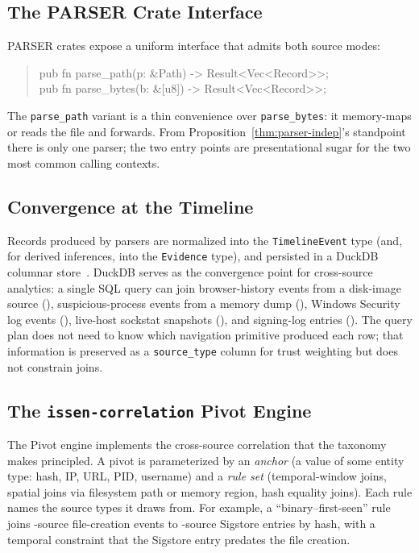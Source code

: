\subsection{The PARSER Crate Interface}

PARSER crates expose a uniform interface that admits both source modes:
\begin{quote}\small\ttfamily
pub fn parse\_path(p: \&Path) -\textgreater{} Result\textless{}Vec\textless{}Record\textgreater\textgreater; \\
pub fn parse\_bytes(b: \&[u8]) -\textgreater{} Result\textless{}Vec\textless{}Record\textgreater\textgreater;
\end{quote}
\noindent
The \texttt{parse\_path} variant is a thin convenience over
\texttt{parse\_bytes}: it memory-maps or reads the file and forwards. From
Proposition~\ref{thm:parser-indep}'s standpoint there is only one parser; the
two entry points are presentational sugar for the two most common calling
contexts.

\subsection{Convergence at the Timeline}

Records produced by parsers are normalized into the
\texttt{TimelineEvent} type (and, for derived inferences, into the
\texttt{Evidence} type), and persisted in a DuckDB columnar
store~\cite{raasveldt2019duckdb}. DuckDB serves as the convergence point
for cross-source analytics: a single SQL query can join browser-history
events from a disk-image source (), suspicious-process events from
a memory dump (), Windows Security log events (), live-host
sockstat snapshots (), and signing-log entries (). The query
plan does not need to know which navigation primitive produced each row;
that information is preserved as a \texttt{source\_type} column for trust
weighting but does not constrain joins.

\subsection{The \texttt{issen-correlation} Pivot Engine}

The Pivot engine implements the cross-source correlation that the taxonomy
makes principled. A pivot is parameterized by an \emph{anchor} (a value of
some entity type: hash, IP, URL, PID, username) and a \emph{rule set}
(temporal-window joins, spatial joins via filesystem path or memory region,
hash equality joins). Each rule names the source types it draws from. For
example, a ``binary--first-seen'' rule joins -source file-creation
events to -source Sigstore entries by hash, with a temporal
constraint that the Sigstore entry predates the file creation.

